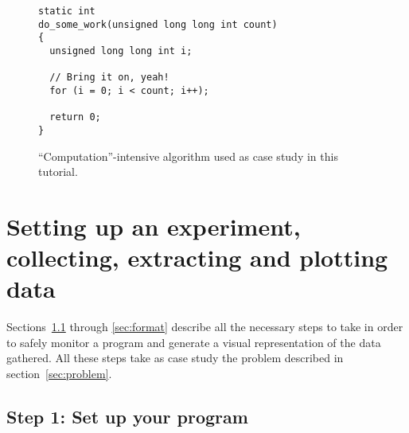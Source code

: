 \begin{figure}
\centering
\begin{lstlisting}
static int
do_some_work(unsigned long long int count)
{
  unsigned long long int i;

  // Bring it on, yeah!
  for (i = 0; i < count; i++);

  return 0;
}
\end{lstlisting}
\caption{``Computation''-intensive algorithm used as case study in this tutorial.}
\label{fig:do_some_work}
\end{figure}

\section{Setting up an experiment, collecting, extracting and plotting data}
\label{sec:process}
Sections~\ref{sec:setup} through \ref{sec:format} describe all the necessary steps to take in order to safely monitor a program and generate a visual representation of the data gathered. All these steps take as case study the problem described in section~\ref{sec:problem}.

\subsection{Step 1: Set up your program}
\label{sec:setup}


